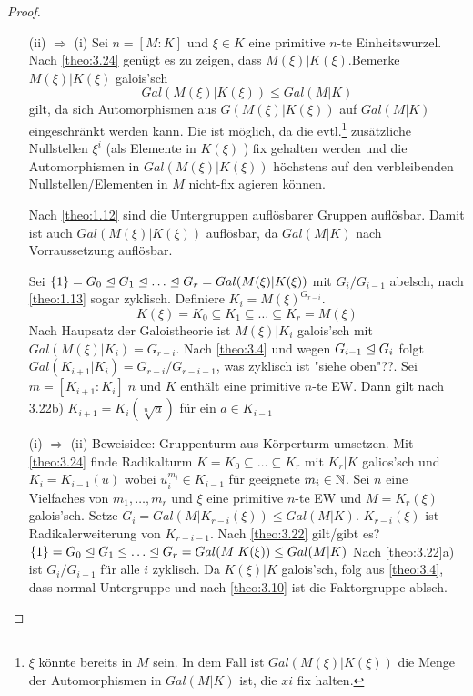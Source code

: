 \documentclass[../main.tex]{subfiles}
\begin{document}
\begin{proof} $ $
    \begin{itemize}
        \item[(ii) $\Rightarrow$ (i)]
        Sei $n=[M:K]$ und $\xi\in\overline{K}$ eine primitive $n$-te Einheitswurzel.
        Nach \ref{theo:3.24} genügt es zu zeigen, dass $M(\xi)|K(\xi)$.
        Bemerke $M(\xi)|K(\xi)$ galois'sch 
        $$Gal(M(\xi)|K(\xi)) \leq Gal(M|K)$$
        gilt, da sich Automorphismen aus $G(M(\xi)|K(\xi))$ auf $Gal(M|K)$ eingeschränkt werden kann.
        Die ist möglich, da die evtl.\footnote{$\xi$ könnte bereits in $M$ sein. In dem Fall ist $Gal(M(\xi)|K(\xi))$ die Menge der Automorphismen in $Gal(M|K)$ ist, die $xi$ fix halten.} zusätzliche Nullstellen $\xi^i$ (als Elemente in $K(\xi)$ ) fix gehalten werden und die Automorphismen in $Gal(M(\xi)|K(\xi))$ höchstens auf den verbleibenden Nullstellen/Elementen in $M$ nicht-fix agieren können.
        
        Nach \cref{theo:1.12} sind die Untergruppen auflösbarer Gruppen auflösbar. Damit ist auch $Gal(M(\xi)|K(\xi))$ auflösbar, da $Gal(M|K)$ nach Vorraussetzung auflösbar.

        Sei $\trivGO = G_0\nteq G_1\nteq \dots\nteq G_r = Gal(M(\xi)|K(\xi))$ mit $G_i/G_{i-1}$ abelsch, nach \ref{theo:1.13} sogar zyklisch.
        Definiere $K_i=M(\xi)^{G_{r-i}}$.
        $$K(\xi) = K_0\subseteq K_1\subseteq \dots\subseteq K_r = M(\xi)$$
        Nach Haupsatz der Galoistheorie ist $M(\xi)|K_i$ galois'sch mit $Gal(M(\xi)|K_i) = G_{r-i}$.
        Nach \ref{theo:3.4} und wegen $G_{i-1}\trianglelefteq G_i$ folgt $Gal(K_{i+1}|K_i) = G_{r-i}/G_{r-i-1}$, was zyklisch ist "siehe oben"??\TODO[What?].
        Sei $m=[K_{i+1}:K_i]|n$ und $K$ enthält eine primitive $n$-te EW.
        Dann gilt nach 3.22b) $K_{i+1}=K_i(\sqrt[n]{a})$ für ein $a\in K_{i-1}$
        \item[(i) $\Rightarrow$ (ii)]
        Beweisidee: Gruppenturm aus Körperturm umsetzen.
        Mit \cref{theo:3.24} finde Radikalturm $K=K_0\subseteq\dots\subseteq K_r$ mit $K_r|K$ galios'sch und $K_i=K_{i-1}(u)$ wobei $u_i^{m_i}\in K_{i-1}$ für geeignete $m_i\in \mathbb{N}$.
        Sei $n$ eine Vielfaches von $m_1,\dots,m_r$ und $\xi$ eine primitive $n$-te EW und $M=K_r(\xi)$ galois'sch.
        Setze $G_i = Gal(M|K_{r-i}(\xi))\leq Gal(M|K)$.
        $K_{r-i}(\xi)$ ist Radikalerweiterung von $K_{r-i-1}$.
        Nach \ref{theo:3.22} gilt/gibt es? $\trivGO=G_0\nteq G_1\nteq \dots \nteq G_r = Gal(M|K(\xi))\leq Gal(M|K)$
        Nach \ref{theo:3.22}a) ist $G_i/G_{i-1}$ für alle $i$ zyklisch.
        Da $K(\xi)|K$ galois'sch, folg aus \ref{theo:3.4}, dass normal Untergruppe und nach \ref{theo:3.10} ist die Faktorgruppe ablsch.
    \end{itemize}
\end{proof}
\end{document}
